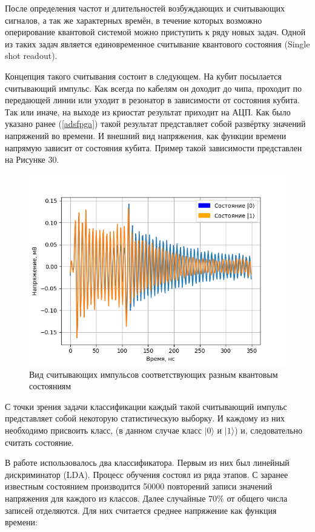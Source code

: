 После определения частот и длительностей возбуждающих и считывающих сигналов, а так же характерных времён, в течение которых возможно оперирование квантовой системой можно приступить к ряду новых задач. Одной из таких задач является единовременное считывание квантового состояния (Single shot readout).  

Концепция такого считывания состоит в следующем. На кубит посылается считывающий импульс. Как всегда по кабелям он доходит до чипа, проходит по передающей линии или уходит в резонатор в зависимости от состояния кубита. Так или иначе, на выходе из криостат результат приходит на АЦП. Как было указано ранее (\ref{adsfpga}) такой результат представляет собой развёртку значений напряжений во времени. И внешний вид напряжения, как функции времени напрямую зависит от состояния кубита. Пример такой зависимости представлен на Рисунке 30.


\begin{figure}[h]
	\centering
	\includegraphics[width=0.7\linewidth]{pictures/Etalones}
	\caption{Вид считывающих импульсов соответствующих разным квантовым состояниям}
	\label{fig:etalones}
\end{figure}

С точки зрения задачи классификации каждый такой считывающий импульс представляет собой некоторую статистическую выборку. И каждому из них необходимо присвоить класс, (в данном случае класс $|0\rangle$ и $|1\rangle$) и, следовательно считать состояние. 

В работе использовалось два классификатора. Первым из них был линейный дискриминатор (LDA). Процесс обучения состоял из ряда этапов. С заранее известным состоянием производится 50000 повторений записи значений напряжения для каждого из классов. Далее случайные $70 \%$ от общего числа записей отделяются. Для них считается среднее напряжение как функция времени:

